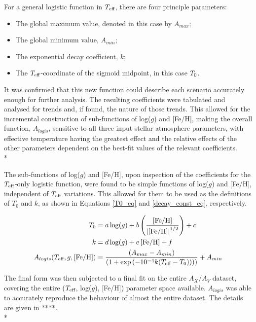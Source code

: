 \documentclass[12pt, a4paper]{report}
\begin{document}
For a general logistic function in $T_{\textnormal{eff}}$, there are four principle parameters:
\begin{itemize}
\item The global maximum value, denoted in this case by $A_{max}$;
\item The global minimum value, $A_{min}$;
\item The exponential decay coefficient, $k$;
\item The $T_{\textnormal{eff}}$-coordinate of the sigmoid midpoint, in this case $T_{\textnormal{0}}$.
\end{itemize}

It was confirmed that this new function could describe each scenario accurately enough for further analysis. The resulting coefficients were tabulated and analysed for trends and, if found, the nature of those trends. This allowed for the incremental construction of sub-functions of log($g$) and [Fe/H], making the overall function, $A_{logis}$, sensitive to all three input stellar atmosphere parameters, with effective temperature having the greatest effect and the relative effects of the other parameters dependent on the best-fit values of the relevant coefficients.\\*

The sub-functions of log($g$) and [Fe/H], upon inspection of the coefficients for the $T_{\textnormal{eff}}$-only logistic function, were found to be simple functions of log($g$) and [Fe/H], independent of $T_{\textnormal{eff}}$ variations. This allowed for them to be used as the definitions of $T_{0}$ and $k$, as shown in Equations \ref{T0_eq} and \ref{decay_const_eq}, respectively.

\begin{align}
T_{\textnormal{0}} &= a\log(g) + b\left(\frac{\left[\textnormal{Fe/H}\right]}{\left|\left[\textnormal{Fe/H}\right]\right|^{1/2}}\right) + c \label{T0_eq}\\
k &= d\log(g) + e\left[\textnormal{Fe/H}\right] + f \label{decay_const_eq}\\
A_{logis}(T_{\textnormal{eff}},g,\left[\textnormal{Fe/H}\right]) &= \frac{(A_{max}-A_{min})}{( 1 + \exp{(-10^{-4} k(T_{\textnormal{eff}}-T_{\textnormal{0}})) ) )}} + A_{min} \label{A_logis_UV}
\end{align}

The final form was then subjected to a final fit on the entire $A_{X}/A_{V}$ dataset, covering the entire ($T_{\textnormal{eff}}$,  log($g$), [Fe/H]) parameter space available. $A_{logis}$ was able to accurately reproduce the behaviour of almost the entire dataset. The details are given in ****.\\*
\end{document}
